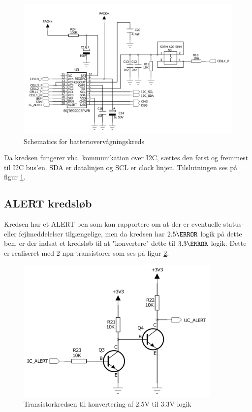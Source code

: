 \begin{figure}[h]
	\centering
	\includegraphics[width=15cm]{billeder/bms_ic_sch.png}
	\caption{Schematics for batteriovervågningskreds}
	\label{fig:temp_sensor}
\end{figure}

Da kredsen fungerer vha. kommunikation over I2C, sættes den først og fremmest til I2C bus'en. SDA er datalinjen og SCL er clock linjen. Tilslutningen ses på figur \ref{fig:temp_sensor}.

\subsection{ALERT kredsløb}
Kredsen har et ALERT ben som kan rapportere om at der er eventuelle status- eller fejlmeddelelser tilgængelige, men da kredsen har $2.5\volt$ logik på dette ben, er der indsat et kredsløb til at "konvertere" \space dette til $3.3\volt$ logik. Dette er realiseret med 2 npn-transistorer som ses på figur \ref{fig:bq_npn_conv}.

\begin{figure}[h]
	\centering
	\includegraphics[width=10cm]{billeder/bq_npn_conv.png}
	\caption{Transistorkredsen til konvertering af 2.5V til 3.3V logik}
	\label{fig:bq_npn_conv}
\end{figure}

